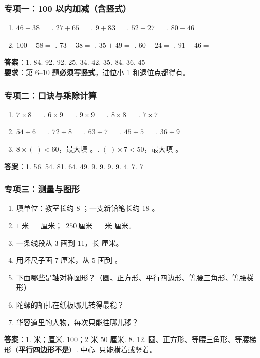 \subsubsection{专项一：100 以内加减（含竖式）}
\begin{enumerate}[label=\arabic*.,itemsep=3pt]
  \item $46+38=$ . $27+65=$ . $9+83=$ . $52-27=$ . $80-46=$
  \item $100-58=$ . $73-38=$ . $35+49=$ . $60-24=$ . $91-46=$
\end{enumerate}
\textbf{答案}：1. 84. 92. 92. 25. 34. 42. 35. 84. 36. 45\\
\textbf{要求}：第 6--10 题\textbf{必须写竖式}，进位小 1 和退位点都得有。

\subsubsection{专项二：口诀与乘除计算}
\begin{enumerate}[label=\arabic*.,itemsep=3pt]
  \item $7\times8=$ . $6\times9=$ . $9\times9=$ . $8\times8=$ . $7\times7=$
  \item $54\div6=$ . $72\div8=$ . $63\div7=$ . $45\div5=$ . $36\div9=$
  \item $8\times(\ )<60$，最大填 \blank[1.2cm]。. $(\ )\times7<50$，最大填 \blank[1.2cm]。
\end{enumerate}
\textbf{答案}：1. 56. 54. 81. 64. 49. 9. 9. 9. 9. 4. 7. 7

\subsubsection{专项三：测量与图形}
\begin{enumerate}[label=\arabic*.,itemsep=3pt]
  \item 填单位：教室长约 8 \blank[1.4cm]；一支新铅笔长约 18 \blank[1.4cm]。
  \item $1\ \text{米}=$ \blank[1.2cm] 厘米；\ $250\ \text{厘米}=$ \blank[1.2cm] 米
        \blank[1.2cm] 厘米。
  \item 一条线段从 3 画到 11，长 \blank[1.2cm] 厘米。
  \item 用坏尺子画 7 厘米，从 5 画到 \blank[1.2cm]。
  \item 下面哪些是轴对称图形？（圆、正方形、平行四边形、等腰三角形、等腰梯形）
  \item 陀螺的轴扎在纸板哪儿转得最稳？
  \item 华容道里的人物，每次只能往哪儿移？
\end{enumerate}
\textbf{答案}：1. 米；厘米. 100；2 米 50 厘米. 8. 12. 圆、正方形、等腰三角形、等腰梯形（\textbf{平行四边形不是}）. 中心. 只能横着或竖着。

